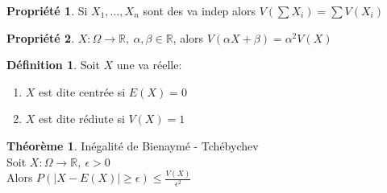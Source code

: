 \documentclass[fleqn]{article}
\theoremstyle{definition} \newtheorem*{defi}{D\'efinition}
\theoremstyle{definition} \newtheorem*{theo}{Th\'eor\`eme}
\theoremstyle{definition} \newtheorem*{coro}{Corollaire}
\theoremstyle{remark} \newtheorem*{rqs}{Remarques}
\theoremstyle{definition} \newtheorem*{prop}{Propri\'et\'e}
\begin{document}
\begin{prop}
	Si $X_1, \hdots, X_n$ sont des va indep alors $V(\sum X_i) = \sum V(X_i)$
\end{prop}

\begin{prop}
	$X:\Omega \rightarrow \mathbb{R},\ \alpha, \beta \in \mathbb{R}$, alors $V(\alpha X + \beta) = \alpha^2 V(X)$
\end{prop}

\begin{defi} Soit $X$ une va r\'eelle:
	\begin{enumerate}
		\item $X$ est dite centr\'ee si $E(X) = 0$
		\item $X$ est dite r\'ediute si $V(X) = 1$
	\end{enumerate}
\end{defi}

\begin{theo} In\'egalit\'e de Bienaym\'e - Tch\'ebychev\\
	Soit $X: \Omega \rightarrow \mathbb{R},\ \epsilon > 0$ \\
	Alors $P(|X-E(X)|\geq \epsilon) \leq \frac{V(X)}{\epsilon^2}$
\end{theo}
\end{document}
